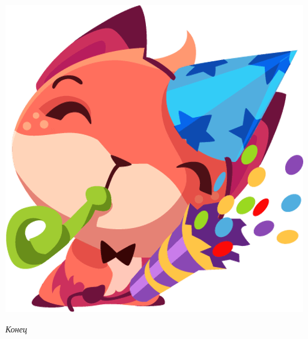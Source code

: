 \vspace*{\fill}
\centerline{
\includegraphics[height=0.3\textheight]{pictures/Foxi/theend}}
\begin{center}
\Large\textit{Конец}
\end{center}
\vspace*{\fill}